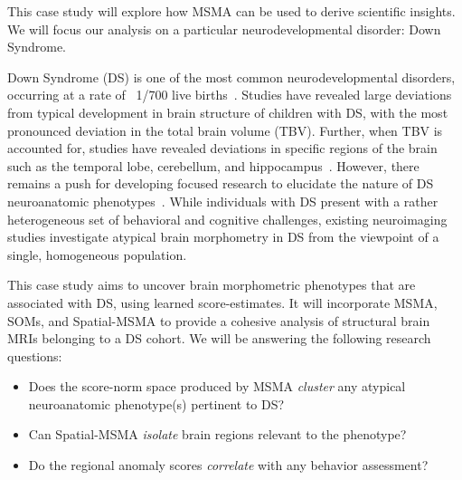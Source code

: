 This case study will explore how MSMA can be used to derive scientific insights. We will focus our analysis on a particular neurodevelopmental disorder: Down Syndrome. 


Down Syndrome (DS) is one of the most common neurodevelopmental disorders, occurring at a rate of ~1/700 live births~\cite{parker2010updated}. Studies have revealed large deviations from typical development in brain structure of children with DS, with the most pronounced deviation in the total brain volume (TBV). Further, when TBV is accounted for, studies have revealed deviations in specific regions of the brain such as the temporal lobe, cerebellum, and hippocampus~\cite{hamnerPediatricBrainDevelopment2018}. However, there remains a push for developing focused research to elucidate the nature of DS neuroanatomic phenotypes~\cite{hamnerPediatricBrainDevelopment2018}. While individuals with DS present with a rather heterogeneous set of behavioral and cognitive challenges, existing neuroimaging studies investigate atypical brain morphometry in DS from the viewpoint of a single, homogeneous population.

This case study aims to uncover brain morphometric phenotypes that are associated with DS, using learned score-estimates. It will incorporate MSMA, SOMs, and Spatial-MSMA to provide a cohesive analysis of structural brain MRIs belonging to a DS cohort. We will be answering the following research questions:

\begin{itemize}
    \item Does the score-norm space produced by MSMA \textit{cluster} any atypical neuroanatomic phenotype(s) pertinent to DS?
    
    \item Can Spatial-MSMA \textit{isolate} brain regions relevant to the phenotype?
    
    \item Do the regional anomaly scores \textit{correlate} with any behavior assessment?
\end{itemize}





